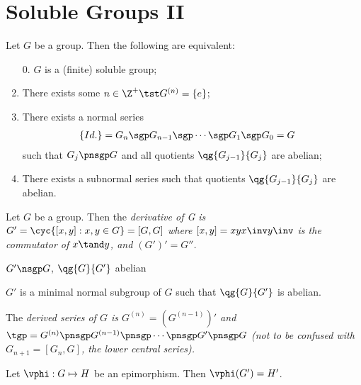 \documentclass[a4paper]{article}
\begin{document}
\section{Soluble Groups II}
\begin{ttheorem}
  Let \( G \) be a group.
  Then the following are equivalent:
  \begin{enumerate}
    \item[0.] \( G \) is a (finite) soluble group;
    \item There exists some \( n\in \Z^{+} \tst G^{(n)} = \left\{ e \right\} \);
    \item There exists a normal series \begin{align*}
      \left\{ Id. \right\} &= G_n \sgp G_{n-1} \sgp \cdots \sgp G_1 \sgp G_0 = G
    \end{align*}
    such that \( G_j \pnsgp G \) and all quotients \( \qg{G_{j-1}}{G_j} \) are abelian;
    \item There exists a subnormal series such that quotients \( \qg{G_{j-1}}{G_j} \) are abelian.
  \end{enumerate}
\end{ttheorem}

\begin{tdefinition}
  Let \( G \) be a group.
  Then the \it{derivative of G} is \( G' = \cyc{[x,y] : x,y\in G} = [G,G] \) where \( [x,y] = xyx\inv y\inv \) is the \it{commutator} of \( x\tand y \), and \( (G')' = G'' \).
\end{tdefinition}

\begin{texercise}
  \( G'\nsgp G \), \( \qg{G}{G'} \) abelian
\end{texercise}

\begin{texercise}
  \( G' \) is a minimal normal subgroup of \( G \) such that \( \qg{G}{G'} \) is abelian.
\end{texercise}

\begin{tdefinition}
  The \it{derived series} of \( G \) is \( G^{(n)} = \left( G^{(n-1)} \right)' \) and \( \tgp = G^{(n)} \pnsgp G^{(n-1)} \pnsgp \cdots \pnsgp G' \pnsgp G \) (not to be confused with \( G_{n+1} = [G_n, G]\), the \it{lower central series}).
\end{tdefinition}

\begin{tlemma}
  Let \( \vphi:G\mapsto H \) be an epimorphism.
  Then \( \vphi(G') = H' \).
\end{tlemma}
\end{document}
